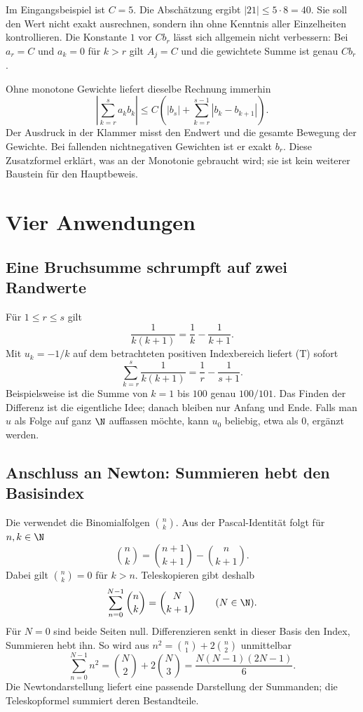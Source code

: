 Im Eingangsbeispiel ist $C=5$. Die Abschätzung ergibt $|21|\leq5\cdot8=40$.
Sie soll den Wert nicht exakt ausrechnen, sondern ihn ohne Kenntnis
aller Einzelheiten kontrollieren. Die Konstante $1$ vor $Cb_r$ lässt
sich allgemein nicht verbessern: Bei $a_r=C$ und $a_k=0$ für $k>r$
gilt $A_j=C$ und die gewichtete Summe ist genau $Cb_r$.

Ohne monotone Gewichte liefert dieselbe Rechnung immerhin
\begin{equation}\tag{V}\label{abel:variation}
 \left|\sum_{k=r}^{s}a_kb_k\right|
 \leq C\left(|b_s|+\sum_{k=r}^{s-1}|b_k-b_{k+1}|\right).
\end{equation}
Der Ausdruck in der Klammer misst den Endwert und die gesamte
Bewegung der Gewichte. Bei fallenden nichtnegativen Gewichten ist er
exakt $b_r$. Diese Zusatzformel erklärt, was an der Monotonie gebraucht
wird; sie ist kein weiterer Baustein für den Hauptbeweis.

\section{Vier Anwendungen}

\subsection*{Eine Bruchsumme schrumpft auf zwei Randwerte}

Für $1\leq r\leq s$ gilt
\[
 \frac1{k(k+1)}=\frac1k-\frac1{k+1}.
\]
Mit $u_k=-1/k$ auf dem betrachteten positiven Indexbereich liefert (T)
sofort
\[
 \boxed{\displaystyle
 \sum_{k=r}^{s}\frac1{k(k+1)}=\frac1r-\frac1{s+1}.}
\]
Beispielsweise ist die Summe von $k=1$ bis $100$ genau $100/101$.
Das Finden der Differenz ist die eigentliche Idee; danach bleiben
nur Anfang und Ende. Falls man $u$ als Folge auf ganz $\N$ auffassen
möchte, kann $u_0$ beliebig, etwa als $0$, ergänzt werden.

\subsection*{Anschluss an Newton: Summieren hebt den Basisindex}

Die \NewtonLink{} verwendet die Binomialfolgen $\binom nk$.
Aus der Pascal-Identität folgt für $n,k\in\N$
\[
 \binom nk=\binom{n+1}{k+1}-\binom n{k+1}.
\]
Dabei gilt $\binom nk=0$ für $k>n$. Teleskopieren gibt deshalb
\[
 \sum_{n=0}^{N-1}\binom nk=\binom N{k+1}\qquad(N\in\N).
\]
Für $N=0$ sind beide Seiten null. Differenzieren senkt in dieser Basis
den Index, Summieren hebt ihn. So wird aus
$n^2=\binom n1+2\binom n2$ unmittelbar
\[
 \sum_{n=0}^{N-1}n^2
 =\binom N2+2\binom N3
 =\frac{N(N-1)(2N-1)}6.
\]
Die Newtondarstellung liefert eine passende Darstellung der Summanden;
die Teleskopformel summiert deren Bestandteile.

